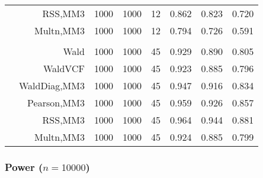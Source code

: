 \documentclass[
]{article}
\begin{document}
\begin{table}[H]
{\begin{tabular}[t]{lrrrrrrr}
\hspace{1em} & RSS,MM3 & 1000 & 1000 & 12 & 0.862 & 0.823 & 0.720\\

\hspace{1em} & Multn,MM3 & 1000 & 1000 & 12 & 0.794 & 0.726 & 0.591\\
\cmidrule{1-8}
\addlinespace[0.3em]
\multicolumn{8}{l}{\textbf{3F 15V}}\\
\hspace{1em} & Wald & 1000 & 1000 & 45 & 0.929 & 0.890 & 0.805\\

\hspace{1em} & WaldVCF & 1000 & 1000 & 45 & 0.923 & 0.885 & 0.796\\

\hspace{1em} & WaldDiag,MM3 & 1000 & 1000 & 45 & 0.947 & 0.916 & 0.834\\

\hspace{1em} & Pearson,MM3 & 1000 & 1000 & 45 & 0.959 & 0.926 & 0.857\\

\hspace{1em} & RSS,MM3 & 1000 & 1000 & 45 & 0.964 & 0.944 & 0.881\\

\hspace{1em} & Multn,MM3 & 1000 & 1000 & 45 & 0.924 & 0.885 & 0.799\\
\bottomrule
\end{tabular}}
\endgroup{}
\end{table}

\hypertarget{power-n10000}{%
\subsubsection{\texorpdfstring{Power
(\(n=10000\))}{Power (n=10000)}}\label{power-n10000}}
\end{document}
